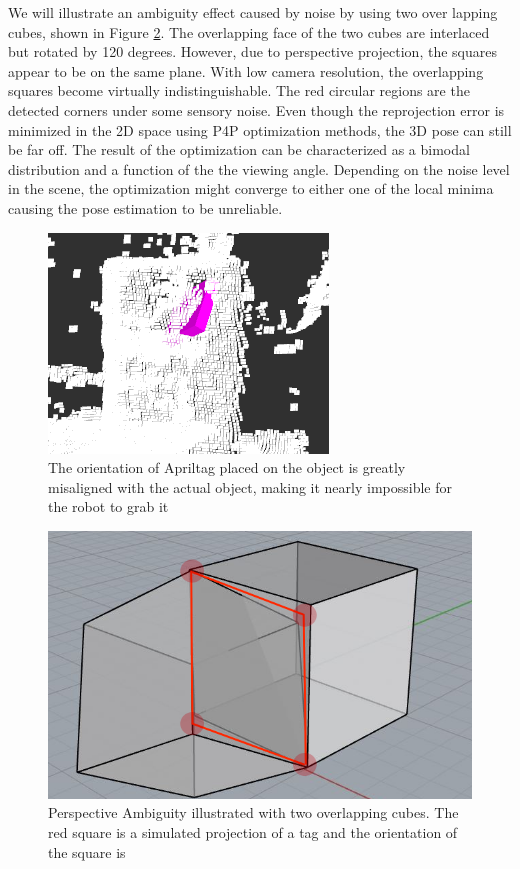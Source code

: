 We will illustrate an ambiguity effect caused by noise by using two over lapping cubes, shown in Figure \ref{fig:cube}. The overlapping face of the two cubes are interlaced but rotated by 120 degrees. However, due to perspective projection, the squares appear to be on the same plane. With low camera resolution, the overlapping squares become virtually indistinguishable. The red circular regions are the detected corners under some sensory noise. Even though the reprojection error is minimized in the 2D space using P4P optimization methods, the 3D pose can still be far off. The result of the optimization can be characterized as a bimodal distribution and a function of the the viewing angle. Depending on the noise level in the scene, the optimization might converge to either one of the local minima causing the pose estimation to be unreliable.
\begin{figure}
\centering
\includegraphics[width=\columnwidth]{figs/mismatch_tag}
\caption{The orientation of Apriltag placed on the object is greatly misaligned with the actual object, making it nearly impossible for the robot to grab it}
\label{fig:mismatch}
\end{figure}

\begin{figure}
\centering
\includegraphics[width=\columnwidth]{figs/perspective_fig}
\caption{Perspective Ambiguity illustrated with two overlapping cubes. The red square is a simulated projection of a tag and the orientation of the square is }
\label{fig:cube}
\end{figure}